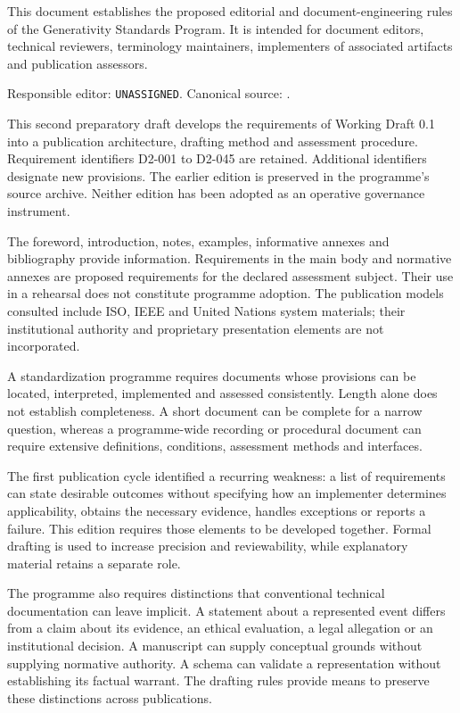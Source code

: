 \documentclass[11pt,a4paper]{article}
\begin{document}
\GSPfrontmatter
{}
This document establishes the proposed editorial and document-engineering rules of the Generativity Standards Program. It is intended for document editors, technical reviewers, terminology maintainers, implementers of associated artifacts and publication assessors.

Responsible editor: \texttt{UNASSIGNED}. Canonical source: .

This second preparatory draft develops the requirements of Working Draft 0.1 into a publication architecture, drafting method and assessment procedure. Requirement identifiers D2-001 to D2-045 are retained. Additional identifiers designate new provisions. The earlier edition is preserved in the programme's source archive. Neither edition has been adopted as an operative governance instrument.

The foreword, introduction, notes, examples, informative annexes and bibliography provide information. Requirements in the main body and normative annexes are proposed requirements for the declared assessment subject. Their use in a rehearsal does not constitute programme adoption. The publication models consulted include ISO, IEEE and United Nations system materials; their institutional authority and proprietary presentation elements are not incorporated.

\tableofcontents
{}
A standardization programme requires documents whose provisions can be located, interpreted, implemented and assessed consistently. Length alone does not establish completeness. A short document can be complete for a narrow question, whereas a programme-wide recording or procedural document can require extensive definitions, conditions, assessment methods and interfaces.

The first publication cycle identified a recurring weakness: a list of requirements can state desirable outcomes without specifying how an implementer determines applicability, obtains the necessary evidence, handles exceptions or reports a failure. This edition requires those elements to be developed together. Formal drafting is used to increase precision and reviewability, while explanatory material retains a separate role.

The programme also requires distinctions that conventional technical documentation can leave implicit. A statement about a represented event differs from a claim about its evidence, an ethical evaluation, a legal allegation or an institutional decision. A manuscript can supply conceptual grounds without supplying normative authority. A schema can validate a representation without establishing its factual warrant. The drafting rules provide means to preserve these distinctions across publications.
\end{document}
